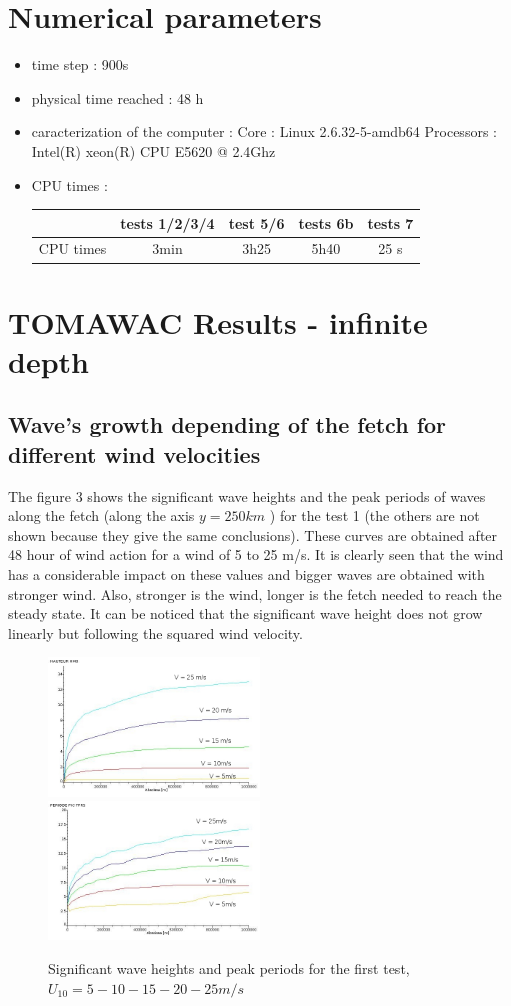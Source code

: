 \documentclass[10pt]{article}
\begin{document}
\section{Numerical parameters}
\begin{itemize}
\item time step : 900s
\item physical time reached : 48 h
\item caracterization of the computer : \subitem Core : Linux 2.6.32-5-amdb64
  \subitem Processors : Intel(R)
xeon(R) CPU E5620 @ 2.4Ghz
\item CPU times : \\
\begin{tabular}{c|c|c|c|c}
 & tests 1/2/3/4 & test 5/6 &tests 6b & tests 7\\
 \hline
CPU times & 3min & 3h25 & 5h40 & 25 s \\
\end{tabular}
\end{itemize}

\section{TOMAWAC Results - infinite depth }
\subsection{Wave's growth depending of the fetch for different wind velocities}
The figure 3 shows the significant wave heights and the peak periods of waves
along the fetch (along the axis $ y = 250 km$ ) for the test 1 (the others are
not shown because they give the same conclusions). These curves are obtained
after 48 hour of wind action for a wind of 5 to 25 m/s. It is clearly seen that
the wind has a considerable impact on these values and bigger waves are
obtained with stronger wind. Also, stronger is the wind, longer is the fetch
needed to reach the steady state. It can be noticed that the significant wave
height does not grow linearly but following the squared wind velocity.
\begin{figure}[H]
  \centering
  \includegraphics[width=0.5\textwidth]{Hm0_free_mesh.jpg}
  \includegraphics[width=0.5\textwidth]{Tp_free_mesh.jpg}
  \caption{Significant wave heights and peak periods for the first test,
    $U_{10} = 5 - 10 - 15 - 20 - 25 m/s$}
\end{figure}
\end{document}
